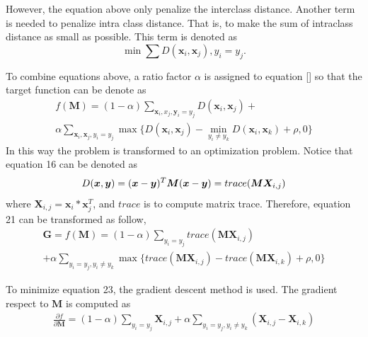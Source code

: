 \documentclass[conference,compsoc]{IEEEtran}
\begin{document}
 However, the equation above only penalize the interclass distance. Another term is needed to penalize intra class distance. That is, to make the sum of intraclass distance as small as possible. This term is denoted as 
 \begin{equation}
 \min \sum D(\bm{x}_i,\bm{x}_j),y_i = y_j.
 \end{equation}
 
 To combine equations above, a ratio factor $\alpha$ is assigned to equation [] so that the target function can be denote as 
  \begin{equation}
  \begin{aligned}
 f(\bm{M}) = (1-\alpha)\sum_{\bm{x}_i,x_j,\bm{y}_i=y_j} D(\bm{x}_i,\bm{x}_j) + \\ 
 \alpha \sum_{\bm{x}_i,\bm{x}_j,y_i=y_j}\max\{{D(\bm{x}_i,\bm{x}_j)-\min_{y_i\ne y_k}{D(\bm{x}_i,\bm{x}_k)}+\rho,0}\}
 \end{aligned}
 \end{equation}
 In this way the problem is transformed to an optimization problem. Notice that equation 16 can be denoted as 
 \begin{equation}
 D(\bm{x},\bm{y}) = (\bm{x} - \bm{y})^T\bm{M}(\bm{x} - \bm{y})\\ = trace(\bm{M}\bm{X}_{i,j})
 \end{equation}
 where $\bm{X}_{i,j} = \bm{x}_i*\bm{x}_j^T$, and $trace$ is to compute matrix trace. Therefore, equation 21 can be transformed as follow,
 \begin{equation}
 \begin{aligned}
 \bm{G} = f(\bm{M}) = (1-\alpha)\sum_{y_i = y_j}trace(\bm{M}\bm{X}_{i,j}) \\
  + \alpha \sum_{y_i = y_j,y_i\ne y_k}\max\{trace(\bm{M}\bm{X}_{i,j}) - trace(\bm{M}\bm{X}_{i,k} )+ \rho,0\}
 \end{aligned}
 \end{equation}
 
 To minimize equation 23, the gradient descent method is used. The gradient respect to $\bm{M}$ is computed as
 \begin{equation}
 \begin{aligned}
 \frac{\partial f}{\partial \bm{M}} = (1-\alpha) \sum_{y_i = y_j} \bm{X}_{i,j} 
 + \alpha \sum_{y_i = y_j, y_i \ne y_k}(\bm{X}_{i,j} - \bm{X}_{i,k})
 \end{aligned}
 \end{equation}
 
\end{document}
